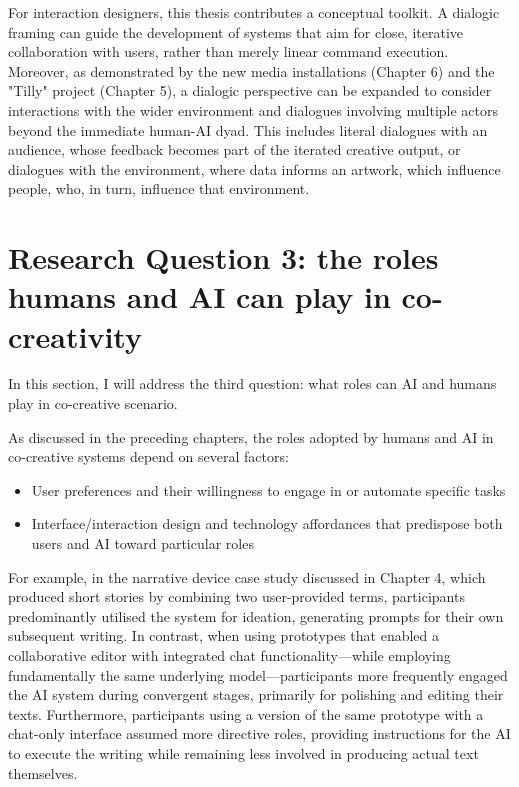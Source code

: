 For interaction designers, this thesis contributes a conceptual toolkit. A dialogic framing can guide the development of systems that aim for close, iterative collaboration with users, rather than merely linear command execution. Moreover, as demonstrated by the new media installations (Chapter 6) and the "Tilly" project (Chapter 5), a dialogic perspective can be expanded to consider interactions with the wider environment and dialogues involving multiple actors beyond the immediate human-AI dyad. This includes literal dialogues with an audience, whose feedback becomes part of the iterated creative output, or dialogues with the environment, where data informs an artwork, which influence people, who, in turn, influence that environment.


\section{Research Question 3: the roles humans and AI can play in co-creativity}

In this section, I will address the third question: what roles can AI and humans play in co-creative scenario.

As discussed in the preceding chapters, the roles adopted by humans and AI in co-creative systems depend on several factors:

\begin{itemize}
    \item User preferences and their willingness to engage in or automate specific tasks
    \item Interface/interaction design and technology affordances that predispose both users and AI toward particular roles
\end{itemize}

For example, in the narrative device case study discussed in Chapter 4, which produced short stories by combining two user-provided terms, participants predominantly utilised the system for ideation, generating prompts for their own subsequent writing. In contrast, when using prototypes that enabled a collaborative editor with integrated chat functionality—while employing fundamentally the same underlying model—participants more frequently engaged the AI system during convergent stages, primarily for polishing and editing their texts. Furthermore, participants using a version of the same prototype with a chat-only interface assumed more directive roles, providing instructions for the AI to execute the writing while remaining less involved in producing actual text themselves.

